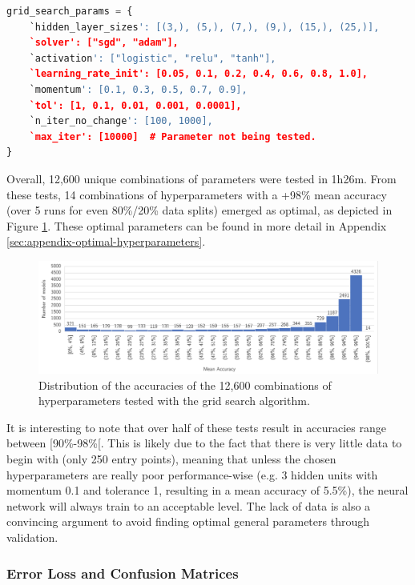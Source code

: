 \documentclass[letterpaper,12pt]{article}
\begin{document}
\begin{lstlisting}[language=Python]
grid_search_params = {
    `hidden_layer_sizes': [(3,), (5,), (7,), (9,), (15,), (25,)],
    `solver': ["sgd", "adam"],
    `activation': ["logistic", "relu", "tanh"],
    `learning_rate_init': [0.05, 0.1, 0.2, 0.4, 0.6, 0.8, 1.0],
    `momentum': [0.1, 0.3, 0.5, 0.7, 0.9],
    `tol': [1, 0.1, 0.01, 0.001, 0.0001],
    `n_iter_no_change': [100, 1000],
    `max_iter': [10000]  # Parameter not being tested.
}
\end{lstlisting}

Overall, 12,600 unique combinations of parameters were tested in 1h26m. From these tests, 14 combinations of hyperparameters with a +98\% mean accuracy (over 5 runs for even 80\%/20\% data splits) emerged as optimal, as depicted in Figure \ref{fig:gridsearch_results}. These optimal parameters can be found in more detail in Appendix \ref{sec:appendix-optimal-hyperparameters}.

\begin{figure}[h] 
\centerline{\includegraphics[width=\textwidth]{report/figures/gridsearch_results.png}}
\caption{\label{fig:gridsearch_results}Distribution of the accuracies of the 12,600 combinations of hyperparameters tested with the grid search algorithm.}
\end{figure}

It is interesting to note that over half of these tests result in accuracies range between [90\%-98\%[. This is likely due to the fact that there is very little data to begin with (only 250 entry points), meaning that unless the chosen hyperparameters are really poor performance-wise (e.g. 3 hidden units with momentum 0.1 and tolerance 1, resulting in a mean accuracy of 5.5\%), the neural network will always train to an acceptable level. The lack of data is also a convincing argument to avoid finding optimal general parameters through validation.

\subsubsection{Error Loss and Confusion Matrices}
\label{sec:eval-errorloss-cm}
\end{document}
